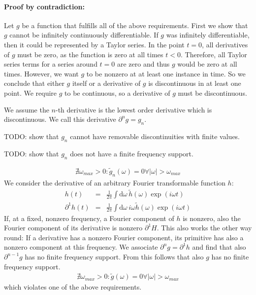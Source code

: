 \documentclass[12pt,a4paper,twoside,openright,BCOR10mm,headsepline,titlepage,abstracton,chapterprefix,final]{scrreprt}
\newcommand\totald{\textrm{d}}
\begin{document}
\paragraph{Proof by contradiction:}
Let $g$ be a function that fulfills all of the above requirements.
First we show that $g$ cannot be infinitely continuously differentiable.
If $g$ was infinitely differentiable, then it could be represented by a Taylor series.
In the point $t=0$, all derivatives of $g$ must be zero, as the function is zero at all times $t<0$.
Therefore, all Taylor series terms for a series around $t=0$ are zero 
and thus $g$ would be zero at all times.
However, we want $g$ to be nonzero at at least one instance in time.
So we conclude that either $g$ itself or a derivative of $g$ is discontinuous in at least one point.
We require $g$ to be continuous, so a derivative of $g$ must be discontinuous.

We assume the $n$-th derivative is the lowest order derivative which is discontinuous.
We call this derivative $\partial^n g = g_n$.

TODO: show that $g_n$ cannot have removable discontinuities with finite values.

TODO: show that $g_n$ does not have a finite frequency support.

\begin{eqnarray}
 \nexists \omega_{max}>0 :  \tilde{g}_n(\omega) = 0 \forall |\omega| > \omega_{max}
\end{eqnarray}
We consider the derivative of an arbitrary Fourier transformable function $h$:
\begin{eqnarray}
 h(t) &=& \frac{1}{2\pi} \int \totald\omega\, \tilde{h}(\omega) \exp(i \omega t) \\
 \partial^1 h(t) &=& \frac{1}{2\pi} \int \totald\omega\, i\omega \tilde{h}(\omega) \exp(i \omega t)
\end{eqnarray}
If, at a fixed, nonzero frequency, a Fourier component of $h$ is nonzero, also the Fourier component of its derivative is nonzero $\partial^1 H$.
This also works the other way round: If a derivative has a nonzero Fourier component, its primitive has also a nonzero component at this frequency.
We associate $\partial^n g = \partial^1 h$ and find that also $\partial^{n-1} g$ has no finite frequency support.
From this follows that also $g$ has no finite frequency support.
\begin{eqnarray}
 \nexists \omega_{max}>0 :  \tilde{g}(\omega) = 0 \forall |\omega| > \omega_{max}
\end{eqnarray}
which violates one of the above requirements.
\end{document}
